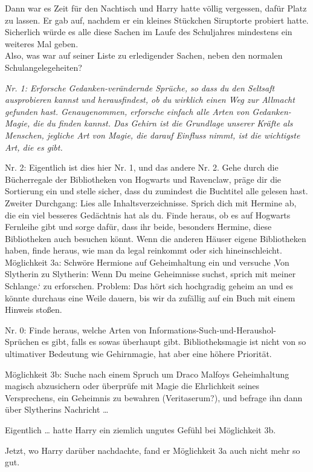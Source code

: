 {Dann war es Zeit für den Nachtisch und Harry hatte völlig vergessen, dafür Platz zu lassen. Er gab auf, nachdem er ein kleines Stückchen Siruptorte probiert hatte. Sicherlich würde es alle diese Sachen im Laufe des Schuljahres mindestens ein weiteres Mal geben.\\ Also, was war auf seiner Liste zu erledigender Sachen, neben den normalen Schulangelegeheiten?

\emph{Nr. 1: Erforsche Gedanken-verändernde Sprüche, so dass du den Seltsaft ausprobieren kannst und herausfindest, ob du wirklich einen Weg zur Allmacht gefunden hast. Genaugenommen, erforsche einfach alle Arten von Gedanken-Magie, die du finden kannst. Das Gehirn ist die Grundlage unserer Kräfte als Menschen, jegliche Art von Magie, die darauf Einfluss nimmt, ist die wichtigste Art, die es gibt.}

Nr. 2: Eigentlich ist dies hier Nr. 1, und das andere Nr. 2. Gehe durch die Bücherregale der Bibliotheken von Hogwarts und Ravenclaw, präge dir die Sortierung ein und stelle sicher, dass du zumindest die Buchtitel alle gelesen hast. Zweiter Durchgang: Lies alle Inhaltsverzeichnisse. Sprich dich mit Hermine ab, die ein viel besseres Gedächtnis hat als du. Finde heraus, ob es auf Hogwarts Fernleihe gibt und sorge dafür, dass ihr beide, besonders Hermine, diese Bibliotheken auch besuchen könnt. Wenn die anderen Häuser eigene Bibliotheken haben, finde heraus, wie man da legal reinkommt oder sich hineinschleicht.\\ Möglichkeit 3a: Schwöre Hermione auf Geheimhaltung ein und versuche ‚Von Slytherin zu Slytherin: Wenn Du meine Geheimnisse suchst, sprich mit meiner Schlange.` zu erforschen. Problem: Das hört sich hochgradig geheim an und es könnte durchaus eine Weile dauern, bis wir da zufällig auf ein Buch mit einem Hinweis stoßen.

Nr. 0: Finde heraus, welche Arten von Informations-Such-und-Heraushol-Sprüchen es gibt, falls es sowas überhaupt gibt. Bibliotheksmagie ist nicht von so ultimativer Bedeutung wie Gehirnmagie, hat aber eine höhere Priorität.

Möglichkeit 3b: Suche nach einem Spruch um Draco Malfoys Geheimhaltung magisch abzusichern oder überprüfe mit Magie die Ehrlichkeit seines Versprechens, ein Geheimnis zu bewahren (Veritaserum?), und befrage ihn dann über Slytherins Nachricht …

Eigentlich … hatte Harry ein ziemlich ungutes Gefühl bei Möglichkeit 3b.

Jetzt, wo Harry darüber nachdachte, fand er Möglichkeit 3a auch nicht mehr so gut.

}
